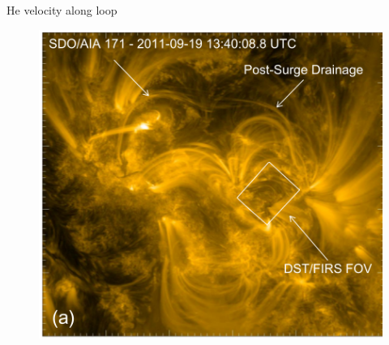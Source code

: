 \documentclass{beamer}
\begin{document}
\begin{frame}{He velocity along loop}

 
\begin{figure}[H]
 \centering
 \includegraphics[scale=0.5]{img1.png}
\end{figure}



\end{frame}
\end{document}
